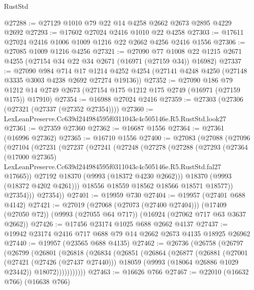 \begin{lexlean}{RustStd}
\begin{coremodule}
@27288 := @27129 @1010 @79 @22 @14 @4258 @2662 @2673 @2895 @4229 @2692
@27293 := @17602 @27024 @2416 @1010 @22 @4258
@27303 := @17611 @27024 @2416 @1006 @1009 @1216 @22 @2662 @4256 @2416 @1556
@27306 := @27085 @1009 @1216 @4256
@27321 := @27090
    @77
    @1008
    @22
    @1215
    @2671
    @4255
    (@27154 @34 @22 @34 @2671 (@16971 (@27159 @34)) @16982)
@27337 := @27090
    @984
    @714
    @17
    @1214
    @4252
    @4254
    (@27141 @4248 @4250 (@27148 @3335 @3003 @4238 @2692 @27274 @19136))
@27352 := @27090
    @186
    @79
    @1212
    @14
    @2749
    @2673
    (@27154 @175 @1212 @175 @2749 (@16971 (@27159 @175)) @17910)
@27354 := @16988 @27024 @2416
@27359 := @27303 (@27306 (@27321 (@27337 (@27352 @27354))))
@27360 := LexLeanPreserve.Cc639d244984595f0311043c4c505146e.R5.RustStd.look27
@27361 := @27359 @27360
@27362 := @16687 @1556
@27364 := @27361 (@16996 @27362)
@27365 := @16710 @1556
@27400 := @27083
    (@27088
      (@27096
        (@27104
          (@27231
            (@27237
              (@27241
                (@27248
                  (@27278
                    (@27288
                      (@27293
                        (@27364
                          (@17000 @27365)
                          LexLeanPreserve.Cc639d244984595f0311043c4c505146e.R5.RustStd.fal27
                          @17665))
                      @27192
                      @18370
                      (@9993 (@18372 @4230 @2662)))
                    @18370
                    (@9993 (@18372 @4202 @4261)))
                  @18556
                  @18559
                  @18562
                  @18566
                  @18571
                  @18577))
              @27354)))
        @27354))
@27401 := @19959 @730
@27404 := @19957 (@27401 @688 @4142)
@27421 := @27019
    (@27068 (@27073 (@27400 @27404)))
    (@17409 (@27050 @72))
    (@9993 (@27055 @64 @717))
    (@16924 (@27062 @717 @63 @3637 @2662))
@27426 := @17456 @23174 @1025 @688 @2662 @4137
@27437 := @19942 @23174 @2416 @717 @688 @79 @14 @2662 @2673 @4135 @18925 @26962
@27440 := @19957 (@23565 @688 @4135)
@27462 := @26736
    (@26758
      (@26797
        (@26799
          (@26801
            (@26818
              (@26834
                (@26851
                  (@26864
                    (@26877
                      (@26881
                        (@27001
                          (@27421 (@27426 (@27437 @27440)))
                          @18059
                          (@9993 (@18064 @26886 @1029 @23442))
                          @18072)))))))))))
@27463 := @16626 @766
@27467 := @22010 (@16632 @766) (@16638 @766)

\end{coremodule}
\end{lexlean}

